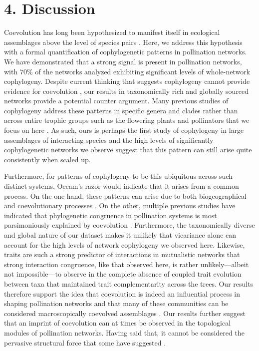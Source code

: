 \documentclass{article}
\begin{document}
\section*{4. Discussion}
	
	Coevolution has long been hypothesized to manifest itself in ecological assemblages above the level of species pairs \citep{Janzen1980, Fox1988, Thompson2005, Olesen2007, Bascompte2014}. Here, we address this hypothesis with a formal quantification of cophylogenetic patterns in pollination networks. We have demonstrated that a strong signal is present in pollination networks, with $70\%$ of the networks analyzed exhibiting significant levels of whole-network cophylogeny. Despite current thinking that suggests cophylogeny cannot provide evidence for coevolution \citep{Thompson2005, Anderson2015}, our results in taxonomically rich and globally sourced networks provide a potential counter argument. Many previous studies of cophylogeny address these patterns in specific genera and clades rather than across entire trophic groups such as the flowering plants and pollinators that we focus on here \citep{Nadler1988, Cruaud2012, Nishiguchi1998, Mikheyev2010, Smith2008}. As such, ours is perhaps the first study of cophylogeny in large assemblages of interacting species and the high levels of significantly cophylogenetic networks we observe suggest that this pattern can still arise quite consistently when scaled up. 
	
	Furthermore, for patterns of cophylogeny to be this ubiquitous across such distinct systems, Occam's razor would indicate that it arises from a common process. On the one hand, these patterns can arise due to both biogeographical \citep{Weckstein2004, Thompson2005} and coevolutionary processes \citep{Thompson2005, Godsoe2009}. On the other, multiple previous studies have indicated that phylogenetic congruence in pollination systems is most parsimoniously explained by coevolution \citep{Smith2008, Godsoe2009}. Furthermore, the taxonomically diverse and global nature of our dataset makes it unlikely that vicariance alone can account for the high levels of network cophylogeny we observed here. Likewise, traits are such a strong predictor of interactions in mutualistic networks \citep{Eklof2013, Dehling2014} that strong interaction congruence, like that observed here, is rather unlikely---albeit not impossible---to observe in the complete absence of coupled trait evolution between taxa that maintained trait complementarity across the trees. Our results therefore support the idea that coevolution is indeed an influential process in shaping pollination networks and that many of these communities can be considered macroscopically coevolved assemblages \citep{Thompson2005}. Our results further suggest that an imprint of coevolution can at times be observed in the topological modules of pollination networks. Having said that, it cannot be considered the pervasive structural force that some have suggested \citep{Fox1988, Thompson2005, Olesen2007, Bascompte2014, Bascompte2015}.
		
\end{document}
